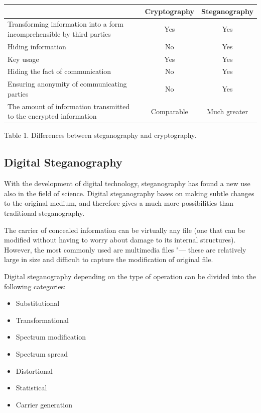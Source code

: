 \documentclass[10pt, a5paper]{article}
\begin{document}
\begin{table}[t!]
\begin{center}
\begin{tabular}{P{13em}|c|c}
\hline
                                                                            & Cryptography & Steganography \\
\hline
Transforming information into a form in\-compre\-hensible by third parties  &     Yes      &     Yes       \\
Hiding information                                                          &     No       &     Yes       \\
Key usage                                                                   &     Yes      &     Yes       \\
Hiding the fact of commu\-ni\-ca\-tion                                      &     No       &     Yes       \\
Ensuring anonymity of commu\-ni\-ca\-ting parties                           &     No       &     Yes       \\
The amount of information transmitted to the encrypted information          &  Comparable  &  Much greater \\
\hline
\end{tabular}

Table 1. Differences between steganography and cryptography.
\end{center}
\end{table}

\subsection*{Digital Steganography}

With the development of digital technology, steganography has found a new use also in the field of science. Digital steganography bases on making subtle changes to the original medium, and therefore gives a much more possibilities than traditional steganography.

The carrier of concealed information can be virtually any file (one that can be modified without having to worry about damage to its internal structures). However, the most commonly used are multimedia files "--- these are relatively large in size and difficult to capture the modification of original file.

Digital steganography depending on the type of operation can be divided into the following categories:

\begin{itemize}
  \item Substitutional
  \item Transformational
  \item Spectrum modification
  \item Spectrum spread
  \item Distortional
  \item Statistical
  \item Carrier generation
\end{itemize}
\end{document}
